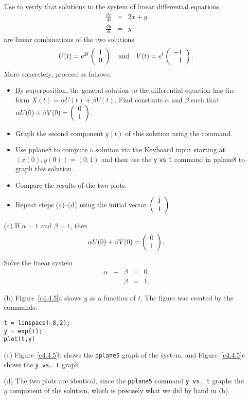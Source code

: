 \documentclass{ximera}
\begin{document}
\begin{exercise} \label{c4.4.5}
Use \Matlab to verify that solutions to the system of linear differential
equations
\begin{eqnarray*}
\frac{dx}{dt} & = & 2x + y\\
\frac{dy}{dt} & = & y
\end{eqnarray*}
are linear combinations of the two solutions
\[
U(t) = e^{2t}\left(\begin{array}{r} 1 \\ 0\end{array}\right) \quad\mbox{and}\quad V(t) = e^{t}\left(\begin{array}{r} -1 \\ 1\end{array}\right).
\]
More concretely, proceed as follows:
\begin{itemize}
\item[(a)]  By superposition, the general solution to the differential
equation has the form $X(t)=\alpha U(t) + \beta V(t)$.  Find constants
$\alpha$ and $\beta$ such that $\alpha U(0) + \beta V(0) = \left(\begin{array}{r} 0 \\ 1\end{array}\right)$.
\item[(b)] Graph the second component $y(t)$ of this solution using the
 command.
\item[(c)] Use {\sf pplane8} to compute a solution via the {\sf Keyboard
input} starting at $(x(0),y(0)) = (0,1)$ and then use the
{\tt y} {\tt vs} {\tt t} command in {\sf pplane8} to graph this solution.
\item[(d)] Compare the results of the two plots.
\item[(e)]  Repeat steps (a)--(d) using the initial vector $\left(\begin{array}{r} 1 \\ 1\end{array}\right)$.
\end{itemize}

\begin{solution}

(a) \ans If $\alpha = 1$ and $\beta = 1$, then
\[
\alpha U(0) + \beta V(0) = \left(\begin{array}{r} 0 \\ 1\end{array}\right). 
\]

\soln Solve the linear system
\[
\begin{array}{rrrrl}
\alpha & - & \beta & = & 0 \\
& & \beta & = & 1. \end{array}
\]

(b) Figure~\ref{c4.4.5}a shows $y$ as a function of $t$.  The figure
was created by the \Matlab commands:
\begin{verbatim}
t = linspace(-8,2);
y = exp(t);
plot(t,y)
\end{verbatim}

(c) Figure~\ref{c4.4.5}b shows the {\tt pplane5} graph of the system,
and Figure~\ref{c4.4.5}c shows the {\tt y vs.\ t} graph.

(d) The two plots are identical, since the {\tt pplane5} command
{\tt y vs.\ t} graphs the $y$ component of the solution, which is
precisely what we did by hand in (b).


\end{solution}
\end{exercise}
\end{document}
